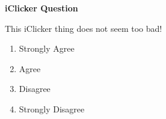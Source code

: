 \documentclass[12pt,letterpaper]{article}
\begin{document}
{\Large\bfseries iClicker Question}

\vspace{0.5in}
{\large This iClicker thing does not seem too bad!}

\vspace{0.3in}
\begin{enumerate}
  \renewcommand{\labelenumi}{\Alph{enumi})}
  \setlength{\itemsep}{0.25in}
  \item Strongly Agree
  \item Agree
  \item Disagree
  \item Strongly Disagree
\end{enumerate}
\end{document}
